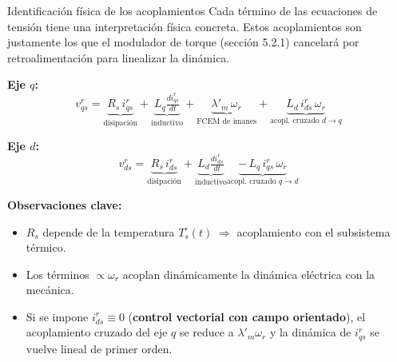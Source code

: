 \documentclass[aspectratio=169,t]{beamer}
\begin{document}
\begin{frame}{Identificación física de los acoplamientos}
{\small\color{uncGray}Cada término de las ecuaciones de tensión tiene una interpretación física concreta. Estos acoplamientos son justamente los que el modulador de torque (sección 5.2.1) cancelará por retroalimentación para linealizar la dinámica.}\par
\vspace{4mm}

\textbf{Eje $q$:}
\begin{equation*}
v^{r}_{qs} = \underbrace{R_s\,i^{r}_{qs}}_{\text{disipación}} + \underbrace{L_q\tfrac{di^{r}_{qs}}{dt}}_{\text{inductivo}} + \underbrace{\lambda'_m\,\omega_r}_{\text{FCEM de imanes}} + \underbrace{L_d\,i^{r}_{ds}\,\omega_r}_{\text{acopl.\ cruzado $d\to q$}}
\end{equation*}

\textbf{Eje $d$:}
\begin{equation*}
v^{r}_{ds} = \underbrace{R_s\,i^{r}_{ds}}_{\text{disipación}} + \underbrace{L_d\tfrac{di^{r}_{ds}}{dt}}_{\text{inductivo}} \underbrace{-\,L_q\,i^{r}_{qs}\,\omega_r}_{\text{acopl.\ cruzado $q\to d$}}
\end{equation*}

\vspace{2mm}
\textbf{Observaciones clave:}
\begin{itemize}\small
\item $R_s$ depende de la temperatura $T_s^\circ(t) \;\Rightarrow$ acoplamiento con el subsistema térmico.
\item Los términos $\propto \omega_r$ acoplan dinámicamente la dinámica eléctrica con la mecánica.
\item Si se impone $i^{r}_{ds}\equiv 0$ (\textbf{control vectorial con campo orientado}), el acoplamiento cruzado del eje $q$ se reduce a $\lambda'_m\omega_r$ y la dinámica de $i^{r}_{qs}$ se vuelve lineal de primer orden.
\end{itemize}
\end{frame}
\end{document}
